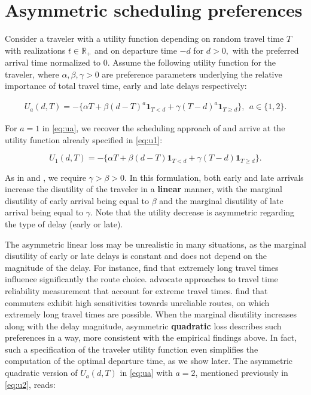 \documentclass[preprint, 3p, authoryear]{elsarticle} %
\theoremstyle{definition}
\theoremstyle{definition}
\theoremstyle{definition}
\theoremstyle{definition}
\theoremstyle{remark}
\begin{document}
\hypertarget{asymmetric-scheduling-preferences}{%
\section{Asymmetric scheduling preferences}\label{asymmetric-scheduling-preferences}}

Consider a traveler with a utility function depending on random travel time \(T\) with realizations \(t\in\mathbb R_+\) and on departure time \(-d\) for \(d>0,\) with the preferred arrival time normalized to \(0\). Assume the following utility function for the traveler, where \(\alpha,\beta, \gamma>0\) are preference parameters underlying the relative importance of total travel time, early and late delays respectively:

\begin{align}
U_a(d,T) = -\{\alpha T + \beta(d-T)^a\mathbf 1_{T<d} + \gamma (T-d)^a\mathbf 1_{T\geq d}\}, ~~a\in\{1,2\}.\label{eq:ua}
\end{align}

For \(a=1\) in \eqref{eq:ua}, we recover the scheduling approach of \citet{fosgerau2010} and arrive at the utility function already specified in \eqref{eq:u1}:

\[U_1(d,T) = -\{\alpha T + \beta(d-T)\mathbf 1_{T<d} + \gamma (T-d)\mathbf 1_{T\geq d}\}.\]

As in \citet{small1982} and \citet{small2015}, we require \(\gamma>\beta>0\). In this formulation, both early and late arrivals increase the disutility of the traveler in a \textbf{linear} manner, with the marginal disutility of early arrival being equal to \(\beta\) and the marginal disutility of late arrival being equal to \(\gamma\). Note that the utility decrease is asymmetric regarding the type of delay (early or late).

The asymmetric linear loss may be unrealistic in many situations, as the marginal disutility of early or late delays is constant and does not depend on the magnitude of the delay. For instance, \citet{enide2006} find that extremely long travel times influence significantly the route choice. \citet{vanlint_etal08} advocate approaches to travel time reliability measurement that account for extreme travel times. \citet{sikka_hanley13} find that commuters exhibit high sensitivities towards unreliable routes, on which extremely long travel times are possible. When the marginal disutility increases along with the delay magnitude, asymmetric \textbf{quadratic} loss describes such preferences in a way, more consistent with the empirical findings above. In fact, such a specification of the traveler utility function even simplifies the computation of the optimal departure time, as we show later. The asymmetric quadratic version of \(U_a(d,T)\) in \eqref{eq:ua} with \(a=2\), mentioned previously in \eqref{eq:u2}, reads:
\end{document}
